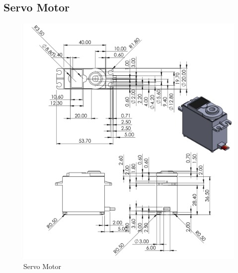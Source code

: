 \clearpage
\subsection{Servo Motor}
\begin{figure}[H]
        \centering
        \includegraphics{Figures/servom.PNG}
        \caption{Servo Motor}
    \end{figure}

